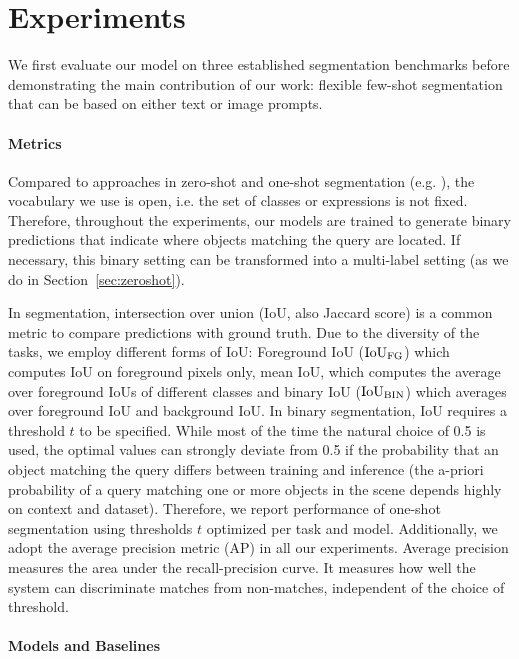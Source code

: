 \documentclass[10pt,twocolumn,letterpaper]{article}
\begin{document}
\section{Experiments}

We first evaluate our model on three established segmentation benchmarks before demonstrating the main contribution of our work: flexible few-shot segmentation that can be based on either text or image prompts.



\paragraph{Metrics}


Compared to approaches in zero-shot and one-shot segmentation (e.g. \cite{bucher19, li20}), the vocabulary we use is open, i.e. the set of classes or expressions is not fixed. Therefore, throughout the experiments, our models are trained to generate binary predictions that indicate where objects matching the query are located. If necessary, this binary setting can be transformed into a multi-label setting (as we do in Section~\ref{sec:zeroshot}).

In segmentation, intersection over union (IoU, also Jaccard score) is a common metric to compare predictions with ground truth. 
Due to the diversity of the tasks, we employ different forms of IoU: Foreground IoU ($\text{IoU}_{\text{FG}}$) which computes IoU on foreground pixels only, mean IoU, which computes the average over foreground IoUs of different classes and binary IoU ($\text{IoU}_{\text{BIN}}$) which averages over foreground IoU and background IoU.
In binary segmentation, IoU requires a threshold $t$ to be specified. While most of the time the natural choice of 0.5 is used, the optimal values can strongly deviate from 0.5 if the probability that an object matching the query differs between training and inference (the a-priori probability of a query matching one or more objects in the scene depends highly on context and dataset). 
Therefore, we report performance of one-shot segmentation using thresholds $t$ optimized per task and model. Additionally, we adopt the average precision metric (AP) in all our experiments.
Average precision measures the area under the recall-precision curve. It measures how well the system can discriminate matches from non-matches, independent of the choice of threshold. 



\paragraph{Models and Baselines}
\end{document}
